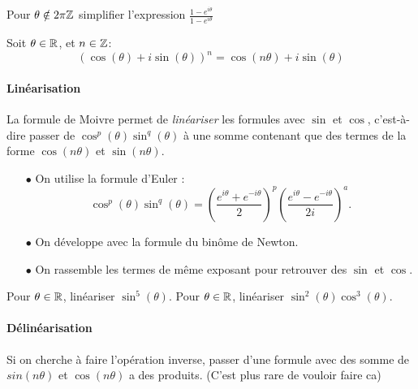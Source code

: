 \documentclass[a4paper, 11pt]{article}
\begin{document}
\begin{exo}
Pour $\theta \notin 2\pi \mathbb{Z}$ simplifier l'expression 
$\frac{1-e^{i\theta}}{1-e^{i\theta}}$
\end{exo}

\begin{prop}
Soit $\theta\in \mathbb{R}$, et $n\in \mathbb{Z}$:
$$(\cos(\theta)+i\sin(\theta))^n =\cos(n\theta)+i\sin(\theta)$$
\end{prop}

\paragraph{Linéarisation}
La formule de Moivre permet de \emph{linéariser} les formules avec $\sin $ et $\cos$, c'est-à-dire passer de $\cos^p(\theta)\sin^q(\theta)$ à une somme contenant que des termes de la forme $\cos(n\theta)$ et $\sin(n\theta)$. 
\begin{itemize}
\item[$\bullet$] On utilise la formule d'Euler : 
$$\cos^p(\theta)\sin^q(\theta) = \left( \frac{e^{i\theta}+e^{-i\theta}}{2}\right)^p  \left( \frac{e^{i\theta}-e^{-i\theta}}{2i}\right)^a.$$
\item[$\bullet$] On développe avec la formule du binôme de Newton. 
\item[$\bullet$] On rassemble les termes de même exposant pour retrouver des $\sin$ et $\cos$. 
\end{itemize}

\begin{exo}
Pour $\theta \in \mathbb{R}$, linéariser $\sin^5(\theta)$. 
Pour $\theta \in \mathbb{R}$, linéariser $\sin^2(\theta)\cos^3(\theta)$. 
\end{exo}

\paragraph{Délinéarisation}
Si on cherche à faire l'opération inverse, passer d'une formule avec des somme de $sin(n\theta)$ et $\cos(n\theta)$ a des produits. (C'est plus rare de vouloir faire ca) 
%
\end{document}
